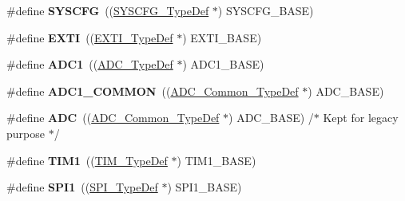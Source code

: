 \begin{DoxyCompactItemize}
\item 
\mbox{\label{group___peripheral__declaration_ga3c833fe1c486cb62250ccbca32899cb8}} 
\#define {\bfseries S\+Y\+S\+C\+FG}~((\hyperlink{struct_s_y_s_c_f_g___type_def}{S\+Y\+S\+C\+F\+G\+\_\+\+Type\+Def} $\ast$) S\+Y\+S\+C\+F\+G\+\_\+\+B\+A\+SE)
\item 
\mbox{\label{group___peripheral__declaration_ga9189e770cd9b63dadd36683eb9843cac}} 
\#define {\bfseries E\+X\+TI}~((\hyperlink{struct_e_x_t_i___type_def}{E\+X\+T\+I\+\_\+\+Type\+Def} $\ast$) E\+X\+T\+I\+\_\+\+B\+A\+SE)
\item 
\mbox{\label{group___peripheral__declaration_ga90d2d5c526ce5c0a551f533eccbee71a}} 
\#define {\bfseries A\+D\+C1}~((\hyperlink{struct_a_d_c___type_def}{A\+D\+C\+\_\+\+Type\+Def} $\ast$) A\+D\+C1\+\_\+\+B\+A\+SE)
\item 
\mbox{\label{group___peripheral__declaration_gaf1919c64fc774aab31190346fd5457e2}} 
\#define {\bfseries A\+D\+C1\+\_\+\+C\+O\+M\+M\+ON}~((\hyperlink{struct_a_d_c___common___type_def}{A\+D\+C\+\_\+\+Common\+\_\+\+Type\+Def} $\ast$) A\+D\+C\+\_\+\+B\+A\+SE)
\item 
\mbox{\label{group___peripheral__declaration_ga54d148b91f3d356713f7e367a2243bea}} 
\#define {\bfseries A\+DC}~((\hyperlink{struct_a_d_c___common___type_def}{A\+D\+C\+\_\+\+Common\+\_\+\+Type\+Def} $\ast$) A\+D\+C\+\_\+\+B\+A\+SE) /$\ast$ Kept for legacy purpose $\ast$/
\item 
\mbox{\label{group___peripheral__declaration_ga2e87451fea8dc9380056d3cfc5ed81fb}} 
\#define {\bfseries T\+I\+M1}~((\hyperlink{struct_t_i_m___type_def}{T\+I\+M\+\_\+\+Type\+Def} $\ast$) T\+I\+M1\+\_\+\+B\+A\+SE)
\item 
\mbox{\label{group___peripheral__declaration_gad483be344a28ac800be8f03654a9612f}} 
\#define {\bfseries S\+P\+I1}~((\hyperlink{struct_s_p_i___type_def}{S\+P\+I\+\_\+\+Type\+Def} $\ast$) S\+P\+I1\+\_\+\+B\+A\+SE)
\item 
\mbox{\label{group___peripheral__declaration_ga92871691058ff7ccffd7635930cb08da}} 

\end{DoxyCompactItemize}
